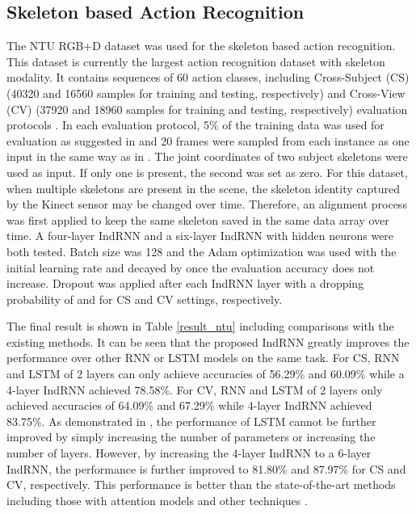 \documentclass[10pt,twocolumn,letterpaper]{article}
\begin{document}
\subsection{Skeleton based Action Recognition}
The NTU RGB+D dataset \cite{shahroudy2016ntu} was used for the skeleton based action recognition. This dataset is currently the largest action recognition dataset with skeleton modality. It contains  sequences of 60 action classes, including Cross-Subject (CS) (40320 and 16560 samples for training and testing, respectively) and Cross-View (CV) (37920 and 18960 samples for training and testing, respectively) evaluation protocols \cite{shahroudy2016ntu}. In each evaluation protocol, 5\% of the training data was used for evaluation as suggested in \cite{shahroudy2016ntu} and 20 frames were sampled from each instance as one input in the same way as in \cite{liu2016spatio}. The joint coordinates of two subject skeletons were used as input. If only one is present, the second was set as zero. For this dataset, when multiple skeletons are present in the scene, the skeleton identity captured by the Kinect sensor may be changed over time. Therefore, an alignment process was first applied to keep the same skeleton saved in the same data array over time. A four-layer IndRNN and a six-layer IndRNN with  hidden neurons were both tested. Batch size was 128 and the Adam optimization was used with the initial learning rate  and decayed by  once the evaluation accuracy does not increase. Dropout \cite{gal2016theoretically} was applied after each IndRNN layer with a dropping probability of  and  for CS and CV settings, respectively. 

The final result is shown in Table \ref{result_ntu} including comparisons with the existing methods. It can be seen that the proposed IndRNN greatly improves the performance over other RNN or LSTM models on the same task. For CS, RNN and LSTM of 2 layers can only achieve accuracies of 56.29\% and 60.09\% while a 4-layer IndRNN achieved 78.58\%. For CV, RNN and LSTM of 2 layers only achieved accuracies of 64.09\% and 67.29\% while 4-layer IndRNN achieved 83.75\%. As demonstrated in \cite{liu2016spatio,shahroudy2016ntu}, the performance of LSTM cannot be further improved by simply increasing the number of parameters or increasing the number of layers. However, by increasing the 4-layer IndRNN to a 6-layer IndRNN, the performance is further improved to 81.80\% and 87.97\% for CS and CV, respectively. This performance is better than the state-of-the-art methods including those with attention models \cite{song2017end,baradel2017pose} and other techniques \cite{zhang2017geometric,liu2016spatio}.
\end{document}
